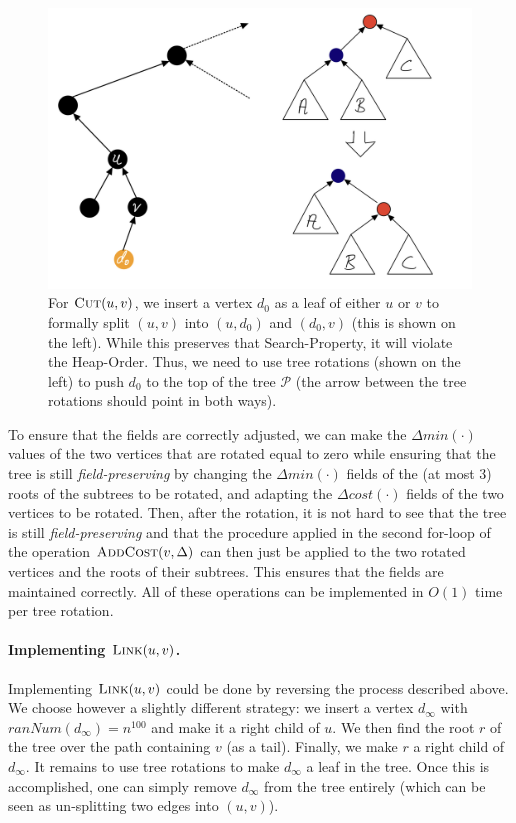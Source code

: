 \begin{figure}[!ht]
    \centering
    \includegraphics[scale=0.2]{./fig/PathCutOperation_lectureDynamicTree.jpeg}
    \caption{For $\textsc{Cut}(u,v)$, we insert a vertex $d_0$ as a leaf of either $u$ or $v$ to formally split $(u,v)$ into $(u,d_0)$ and $(d_0,v)$ (this is shown on the left). While this preserves that Search-Property, it will violate the Heap-Order. Thus, we need to use tree rotations (shown on the left) to push $d_0$ to the top of the tree $\mathcal{P}$ (the arrow between the tree rotations should point in both ways).}
    \label{fig:binaryTreeRotation}
\end{figure}

To ensure that the fields are correctly adjusted, we can make the $\Delta min(\cdot)$ values of the two vertices that are rotated equal to zero while ensuring that the tree is still \emph{field-preserving} by changing the $\Delta min(\cdot)$ fields of the (at most 3) roots of the subtrees to be rotated, and adapting the $\Delta cost(\cdot)$ fields of the two vertices to be rotated. Then, after the rotation, it is not hard to see that the tree is still \emph{field-preserving} and that the procedure applied in the second for-loop of the operation $\textsc{AddCost}(v, \Delta)$ can then just be applied to the two rotated vertices and the roots of their subtrees. This ensures that the fields are maintained correctly. All of these operations can be implemented in $O(1)$ time per tree rotation.

\paragraph{Implementing $\textsc{Link}(u,v)$.} Implementing $\textsc{Link}(u,v)$ could be done by reversing the process described above. We choose however a slightly different strategy: we insert a vertex $d_{\infty}$ with $ranNum(d_{\infty}) = n^{100}$ and make it a right child of $u$. We then find the root $r$ of the tree over the path containing $v$ (as a tail). Finally, we make $r$ a right child of $d_{\infty}$. It remains to use tree rotations to make $d_{\infty}$ a leaf in the tree.  Once this is accomplished, one can simply remove $d_{\infty}$ from the tree entirely (which can be seen as un-splitting two edges into $(u,v)$).  

